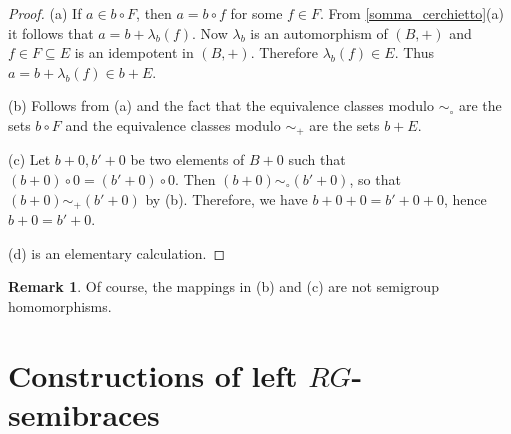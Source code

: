 \documentclass[11pt]{amsart}
\newtheorem{proposition}[theorem]{Proposition}
\theoremstyle{definition}
\newtheorem{remark}[theorem]{Remark}
\begin{document}
\begin{proof} (a) If $a\in b\circ F$, then $a=b\circ f$ for some $f\in F$. From \cref{somma_cerchietto}(a) it follows that $a=b+\lambda_b(f)$. Now $\lambda_b$ is an automorphism of $(B,+ )$ and $f\in F\subseteq E$ is an idempotent in $(B,+ )$. Therefore $\lambda_b(f)\in E$. Thus $a=b+\lambda_b(f)\in b+E$.


(b) Follows from (a) and the fact that the equivalence classes modulo $\sim_\circ$ are the sets $b\circ F$ and the equivalence classes modulo $\sim_+$ are the sets $b+E$.

(c) Let $b+0, b'+0$ be two elements of $B+0$ such that $(b+0)\circ 0=(b'+0)\circ 0$. Then $(b+0)\sim_\circ(b'+0)$, so that $(b+0)\sim_+(b'+0)$ by (b). Therefore, we have $b+0+0=b'+0+0$, hence $b+0=b'+0$.

(d) is an elementary calculation.
\end{proof}



\begin{remark}
    Of course, the mappings in {\rm (b)} and {\rm (c)} are not semigroup homomorphisms. 
\end{remark}













\smallskip

\section{Constructions of left \texorpdfstring{$RG$-}{-}semibraces}
\end{document}
